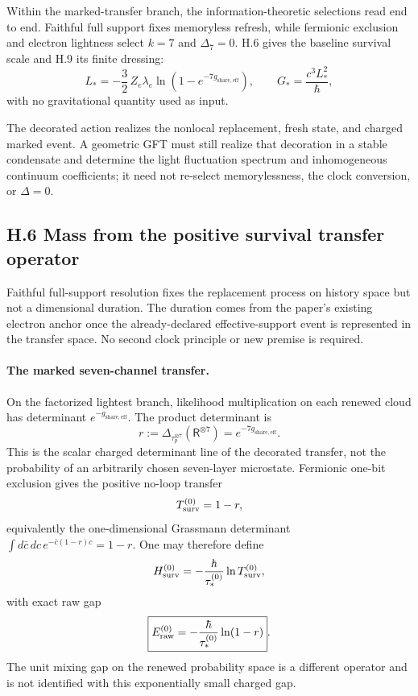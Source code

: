 \documentclass[11pt]{article}
\begin{document}
Within the marked-transfer branch, the information-theoretic selections read end to end. Faithful full support fixes memoryless refresh, while fermionic exclusion and electron lightness select $k=7$ and $\Delta_7=0$. H.6 gives the baseline survival scale and H.9 its finite dressing:
\[
L_*=-\frac32\,Z_e\lambda_e\ln\!\left(1-e^{-7g_{\mathrm{share,eff}}}\right),
\qquad
G_*=\frac{c^3L_*^2}{\hbar},
\]
with no gravitational quantity used as input.

The decorated action realizes the nonlocal replacement, fresh state, and charged marked event. A geometric GFT must still realize that decoration in a stable condensate and determine the light fluctuation spectrum and inhomogeneous continuum coefficients; it need not re-select memorylessness, the clock conversion, or $\Delta=0$.

\subsection*{H.6 Mass from the positive survival transfer operator}

Faithful full-support resolution fixes the replacement process on history space but not a dimensional duration. The duration comes from the paper's existing electron anchor once the already-declared effective-support event is represented in the transfer space. No second clock principle or new premise is required.

\paragraph{The marked seven-channel transfer.}
On the factorized lightest branch, likelihood multiplication on each renewed cloud has determinant $e^{-g_{\mathrm{share,eff}}}$. The product determinant is
\[
r:=\Delta_{\tau_p^{\otimes7}}(\mathsf R^{\otimes7})
=e^{-7g_{\mathrm{share,eff}}}.
\]
This is the scalar charged determinant line of the decorated transfer, not the probability of an arbitrarily chosen seven-layer microstate. Fermionic one-bit exclusion gives the positive no-loop transfer
\[
T_{\rm surv}^{(0)}=1-r,
\]
equivalently the one-dimensional Grassmann determinant $\int d\bar c\,dc\,e^{-\bar c(1-r)c}=1-r$. One may therefore define
\[
H_{\rm surv}^{(0)}=-\frac{\hbar}{\tau_*^{(0)}}\ln T_{\rm surv}^{(0)},
\]
with exact raw gap
\[
\boxed{E_{\rm raw}^{(0)}=-\frac{\hbar}{\tau_*^{(0)}}\ln(1-r)}.
\]
The unit mixing gap on the renewed probability space is a different operator and is not identified with this exponentially small charged gap.
\end{document}
